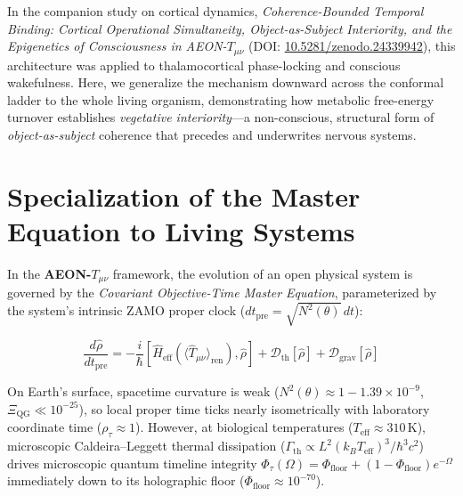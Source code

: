 \documentclass[11pt,a4paper]{article}
\begin{document}
In the companion study on cortical dynamics, \emph{Coherence-Bounded Temporal Binding: Cortical Operational Simultaneity, Object-as-Subject Interiority, and the Epigenetics of Consciousness in AEON-$T_{\mu\nu}$} (DOI: \href{https://doi.org/10.5281/zenodo.24339942}{10.5281/zenodo.24339942}), this architecture was applied to thalamocortical phase-locking and conscious wakefulness. Here, we generalize the mechanism downward across the conformal ladder to the whole living organism, demonstrating how metabolic free-energy turnover establishes \emph{vegetative interiority}---a non-conscious, structural form of \emph{object-as-subject} coherence that precedes and underwrites nervous systems.

\section{Specialization of the Master Equation to Living Systems}

In the \textbf{AEON-$T_{\mu\nu}$} framework, the evolution of an open physical system is governed by the \emph{Covariant Objective-Time Master Equation}, parameterized by the system's intrinsic ZAMO proper clock ($dt_{\mathrm{pre}} = \sqrt{N^2(\theta)}\,dt$):
\begin{formulabox}
\begin{equation}
\frac{d\hat{\rho}}{dt_{\mathrm{pre}}} = -\frac{i}{\hbar}\left[\hat{H}_{\mathrm{eff}}\left(\langle \hat{T}_{\mu\nu}\rangle_{\mathrm{ren}}\right), \hat{\rho}\right] + \mathcal{D}_{\mathrm{th}}[\hat{\rho}] + \mathcal{D}_{\mathrm{grav}}[\hat{\rho}]
\label{eq:master}
\end{equation}
\end{formulabox}

On Earth's surface, spacetime curvature is weak ($N^2(\theta) \approx 1 - 1.39 \times 10^{-9}$, $\Xi_{\mathrm{QG}} \ll 10^{-25}$), so local proper time ticks nearly isometrically with laboratory coordinate time ($\rho_\tau \approx 1$). However, at biological temperatures ($T_{\mathrm{eff}} \approx 310\,\mathrm{K}$), microscopic Caldeira--Leggett thermal dissipation ($\Gamma_{\mathrm{th}} \propto L^2 (k_B T_{\mathrm{eff}})^3 / \hbar^3 c^2$) drives microscopic quantum timeline integrity $\Phi_\tau(\Omega) = \Phi_{\mathrm{floor}} + (1 - \Phi_{\mathrm{floor}})e^{-\Omega}$ immediately down to its holographic floor ($\Phi_{\mathrm{floor}} \approx 10^{-70}$).
\end{document}
